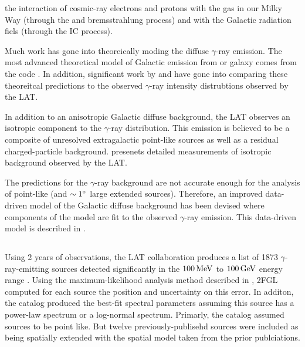the interaction of cosmic-ray electrons and protons with the gas in our
Milky Way (through the \pion and bremsstrahlung process) and with the
Galactic radiation fiels (through the \ac{IC} process).

Much work has gone into theoreically moding the diffuse
$\gamma$-ray emission. The most advanced theoretical model
of Galactic emission from or galaxy comes from the \galprop code
\citep{strong_1998a_propagation-cosmic-ray,moskalenko_2000a_anisotropic-inverse}.
In addition, significant work by \cite{abdo_2009a_fermi-large} and
\cite{ackermann_2012a_fermi-lat-observations} have gone into comparing
these theoreitcal predictions to the observed $\gamma$-ray intensity
distrubtions observed by the \ac{LAT}.

In addition to an anisotropic Galactic diffuse background, the \ac{LAT}
observes an isotropic component to the $\gamma$-ray distribution.
This emission is believed to be a composite of unresolved extragalactic
point-like sources as well as a residual charged-particle background.
\cite{abdo_2010a_spectrum-isotropic} presenets detailed measurements of
isotropic background observed by the \ac{LAT}.

The \galprop predictions for the $\gamma$-ray background are not
accurate enough for the analysis of point-like (and $\sim1^\circ$
large extended sources).  Therefore, an improved data-driven model
of the Galactic diffuse background has been devised where components
of the \galprop model are fit to the observed $\gamma$-ray emission.
This data-driven model is described in \cite{nolan_2012_fermi-large}.


\subsection{}

Using 2 years of observations, the \ac{LAT} collaboration produces
a list of 1873 $\gamma$-ray-emitting sources detected significantly
in the $100\,\text{MeV}$ to $100\,\text{GeV}$ energy range
\cite{nolan_2012_fermi-large}.  Using the maximum-likelihood analysis
method described in , \ac{2FGL}
computed for each source the position and uncertainty on this error. In
additon, the catalog produced the best-fit spectral parameters assuming
this source has a power-law spectrum or a log-normal spectrum.
Primarly, the catalog assumed sources to be point like. But twelve
previously-publisehd sources were included as being spatially extended
with the spatial model taken from the prior publciations.

